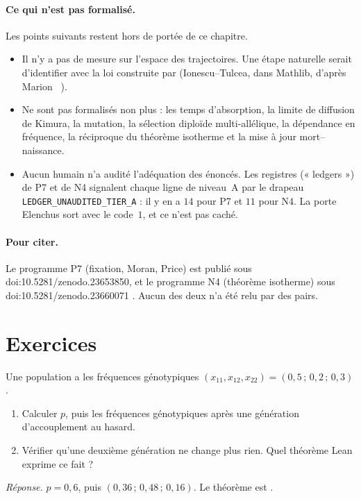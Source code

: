 \paragraph{Ce qui n'est pas formalisé.} Les points suivants restent hors de portée de ce chapitre.
\begin{itemize}[itemsep=1pt]
\item Il n'y a pas de mesure sur l'espace des trajectoires. Une étape naturelle serait d'identifier 
avec la loi construite par  (Ionescu--Tulcea, dans Mathlib, d'après Marion
\tierL{}~\cite{ch4:Mar}).
\item Ne sont pas formalisés non plus : les temps d'absorption, la limite de diffusion de Kimura, la mutation, la
sélection diploïde multi-allélique, la dépendance en fréquence, la réciproque du théorème isotherme et la mise à
jour mort--naissance.
\item Aucun humain n'a audité l'adéquation des énoncés. Les registres (« ledgers ») de P7 et de N4 signalent
chaque ligne de niveau~A par le drapeau \texttt{LEDGER\_UNAUDITED\_TIER\_A} : il y en a $14$ pour P7 et $11$
pour N4. La porte Elenchus sort avec le code~$1$, et ce n'est pas caché.
\end{itemize}

\paragraph{Pour citer.} Le programme P7 (fixation, Moran, Price) est publié sous doi:10.5281/zenodo.23653850, et
le programme N4 (théorème isotherme) sous doi:10.5281/zenodo.23660071 \cite{ch4:P7,ch4:N4}. Aucun des deux n'a été
relu par des pairs.

\section{Exercices}\label{ch4:sec:exercices}

\begin{exercise}\label{ch4:ex:hw}
Une population a les fréquences génotypiques $(x_{11},x_{12},x_{22})=(0{,}5\,;\,0{,}2\,;\,0{,}3)$.
\begin{enumerate}[label=\alph*),itemsep=0pt]
\item Calculer $p$, puis les fréquences génotypiques après une génération d'accouplement au hasard.
\item Vérifier qu'une deuxième génération ne change plus rien. Quel théorème Lean exprime ce fait ?
\end{enumerate}
\emph{Réponse.} $p=0{,}6$, puis $(0{,}36\,;\,0{,}48\,;\,0{,}16)$. Le théorème est .
\end{exercise}

